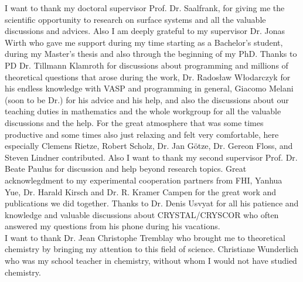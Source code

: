 \documentclass[11pt,DIV=13,BCOR=5mm,a4paper,headinclude]{scrbook}
\begin{document}

\begingroup
\renewcommand{\cleardoublepage}{}
\clearpage
{}
\endgroup
I want to thank my doctoral supervisor Prof. Dr. Saalfrank, for giving me the scientific opportunity to research on surface systems and all the valuable discussions and advices.
Also I am deeply grateful to my supervisor Dr. Jonas Wirth who gave me support during my time starting as a Bachelor's student, during my Master's thesis and also through the beginning of my PhD.
Thanks to PD Dr. Tillmann Klamroth for discussions about programming and millions of theoretical questions that arose during the work, Dr. Rados\l{}aw W\l{}odarczyk for his endless knowledge with VASP and programming in general, Giacomo Melani (soon to be Dr.) for his advice and his help, and also the discussions about our teaching duties in mathematics and the whole workgroup for all the valuable discussions and the help.
For the great atmosphere that was some times productive and some times also just relaxing and felt very comfortable, here especially Clemens Rietze, Robert Scholz, Dr. Jan Götze, Dr. Gereon Floss, and Steven Lindner contributed.
Also I want to thank my second supervisor Prof. Dr. Beate Paulus for discussion and help beyond research topics.
Great acknowlegdment to my experimental cooperation partners from FHI, Yanhua Yue, Dr. Harald Kirsch and Dr. R. Kramer Campen for the great work and publications we did together.
Thanks to Dr. Denis Usvyat for all his patience and knowledge and valuable discussions about CRYSTAL/CRYSCOR who often answered my questions from his phone during his vacations.\\
I want to thank Dr. Jean Christophe Tremblay who brought me to theoretical chemistry by bringing my attention to this field of science.
Christiane Wunderlich who was my school teacher in chemistry, without whom I would not have studied chemistry.
\end{document}
